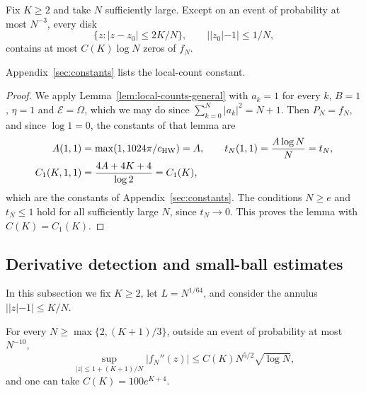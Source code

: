\begin{lemma}\label{lem:local-counts}
Fix $K\ge2$ and take $N$ sufficiently large.
Except on an event of probability at most $N^{-3}$, every disk
\[
 \{z:|z-z_0|\le2K/N\},\qquad ||z_0|-1|\le1/N,
\]
contains at most $C(K)\log N$ zeros of $f_N$.
\end{lemma}

Appendix~\ref{sec:constants} lists the local-count constant.

\begin{proof}
We apply Lemma~\ref{lem:local-counts-general} with $a_k=1$ for every $k$,
$B=1$, $\eta=1$ and $\mathcal E=\Omega$, which we may do since
$\sum_{k=0}^N|a_k|^2=N+1$.
Then $P_N=f_N$, and since $\log1=0$, the constants of that lemma are
\begin{align*}
 A(1,1)&=\max(1,1024\pi/c_{\rm HW})=A,\qquad
 t_N(1,1)=\frac{A\log N}N=t_N,\\
 C_1(K,1,1)&=\frac{4A+4K+4}{\log2}=C_1(K),
\end{align*}
which are the constants of Appendix~\ref{sec:constants}.
The conditions $N\ge e$ and $t_N\le1$ hold for all sufficiently large
$N$, since $t_N\to0$.
This proves the lemma with $C(K)=C_1(K)$.
\end{proof}

\subsection{Derivative detection and small-ball estimates}\label{sec:derivative-detection}
In this subsection we fix $K\ge2$, let $L=N^{1/64}$, and consider the
annulus $||z|-1|\le K/N$.

\begin{lemma}\label{lem:second-derivative}
For every $N\ge\max\{2,(K+1)/3\}$, outside an event of probability at most
$N^{-10}$,
\begin{equation}
 \sup_{|z|\le1+(K+1)/N}|f_N''(z)|
 \le C(K)N^{5/2}\sqrt{\log N},
                                                        \label{eq:sign-second-derivative}
\end{equation}
and one can take $C(K)=100e^{K+4}$.
\end{lemma}

